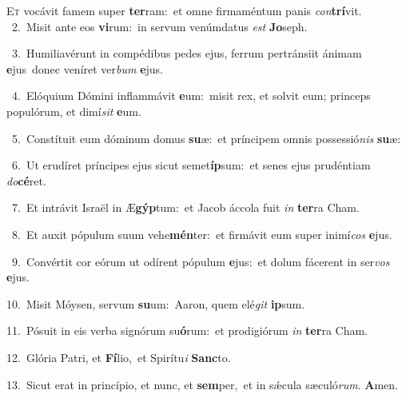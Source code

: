 \lettrine{\initial\textcolor{\initialcolor}{E}}{t} vocávit famem super \textbf{ter}\-ram:~\star et omne firmaméntum panis \textit{con}\-\textbf{trí}vit.\\
{\numbfont\textcolor{\numbcolor}{~2.}}~Misit ante eos \textbf{vi}\-rum:~\star in servum venúmdatus \textit{est} \textbf{Jo}\-seph.\par
{\numbfont\textcolor{\numbcolor}{~3.}}~Humiliavérunt in compédibus pedes ejus, ferrum pertránsiit ánimam \textbf{e}\-jus~\star donec veníret ver\textit{bum} \textbf{e}\-jus.\par
{\numbfont\textcolor{\numbcolor}{~4.}}~Elóquium Dómini inflammávit \textbf{e}\-um:~\star misit rex, et solvit eum; princeps populórum, et dimí\textit{sit} \textbf{e}\-um.\par
{\numbfont\textcolor{\numbcolor}{~5.}}~Constítuit eum dóminum domus \textbf{su}\-æ:~\star et príncipem omnis possessió\textit{nis} \textbf{su}\-æ:\par
{\numbfont\textcolor{\numbcolor}{~6.}}~Ut erudíret príncipes ejus sicut semet\-\textbf{íp}\-sum:~\star et senes ejus prudéntiam \textit{do}\-\textbf{cé}ret.\par
{\numbfont\textcolor{\numbcolor}{~7.}}~Et intrávit Israël in Æ\-\textbf{gýp}\-tum:~\star et Jacob áccola fuit \textit{in} \textbf{ter}\-ra Cham.\par
{\numbfont\textcolor{\numbcolor}{~8.}}~Et auxit pópulum suum vehe\-\textbf{mén}\-ter:~\star et firmávit eum super inimí\textit{cos} \textbf{e}\-jus.\par
{\numbfont\textcolor{\numbcolor}{~9.}}~Convértit cor eórum ut odírent pópulum \textbf{e}\-jus:~\star et dolum fácerent in ser\textit{vos} \textbf{e}\-jus.\par
{\numbfont\textcolor{\numbcolor}{10.}}~Misit Móysen, servum \textbf{su}\-um:~\star Aaron, quem elé\textit{git} \textbf{ip}\-sum.\par
{\numbfont\textcolor{\numbcolor}{11.}}~Pósuit in eis verba signórum su\-\textbf{ó}\-rum:~\star et prodigiórum \textit{in} \textbf{ter}\-ra Cham.\par
{\numbfont\textcolor{\numbcolor}{12.}}~Glória Patri, et \textbf{Fí}\-lio,~\star et Spirítu\textit{i} \textbf{Sanc}\-to.\par
{\numbfont\textcolor{\numbcolor}{13.}}~Sicut erat in princípio, et nunc, et \textbf{sem}\-per,~\star et in sǽcula sæculó\-\textit{rum}\-. \textbf{A}\-men.\par
